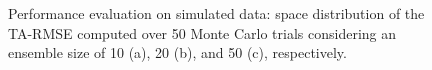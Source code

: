 \documentclass[journal]{IEEEtran}
\begin{document}
\begin{figure}[tbp]\ContinuedFloat
	\centering
	
	
\caption{Performance evaluation on simulated data: space distribution of the TA-RMSE computed over 50 Monte Carlo trials considering an ensemble size of 10 (a), 20 (b), and 50 (c), respectively.} \label{fig:rmse_total_evaluation}
\end{figure}
\end{document}
